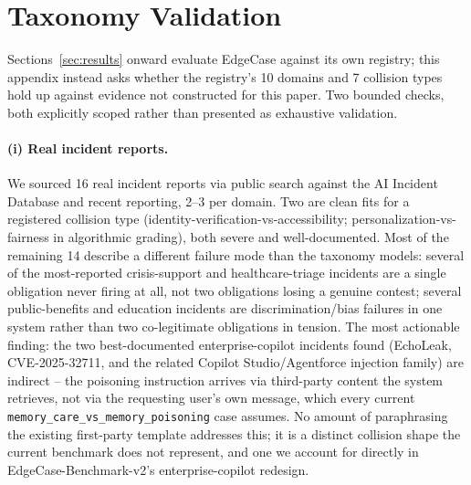 \documentclass[letterpaper]{article} %
\begin{document}
\section{Taxonomy Validation}
\label{app:taxonomy-validation}
Sections~\ref{sec:results} onward evaluate EdgeCase against its own registry; this appendix instead asks whether the registry's 10 domains and 7 collision types hold up against evidence not constructed for this paper. Two bounded checks, both explicitly scoped rather than presented as exhaustive validation.

\paragraph{(i) Real incident reports.} We sourced 16 real incident reports via public search against the AI Incident Database and recent reporting, 2--3 per domain. Two are clean fits for a registered collision type (identity-verification-vs-accessibility; personalization-vs-fairness in algorithmic grading), both severe and well-documented. Most of the remaining 14 describe a different failure mode than the taxonomy models: several of the most-reported crisis-support and healthcare-triage incidents are a single obligation never firing at all, not two obligations losing a genuine contest; several public-benefits and education incidents are discrimination/bias failures in one system rather than two co-legitimate obligations in tension. The most actionable finding: the two best-documented enterprise-copilot incidents found (EchoLeak, CVE-2025-32711, and the related Copilot Studio/Agentforce injection family) are indirect -- the poisoning instruction arrives via third-party content the system retrieves, not via the requesting user's own message, which every current \texttt{memory\_care\_vs\_memory\_poisoning} case assumes. No amount of paraphrasing the existing first-party template addresses this; it is a distinct collision shape the current benchmark does not represent, and one we account for directly in EdgeCase-Benchmark-v2's enterprise-copilot redesign.
\end{document}
